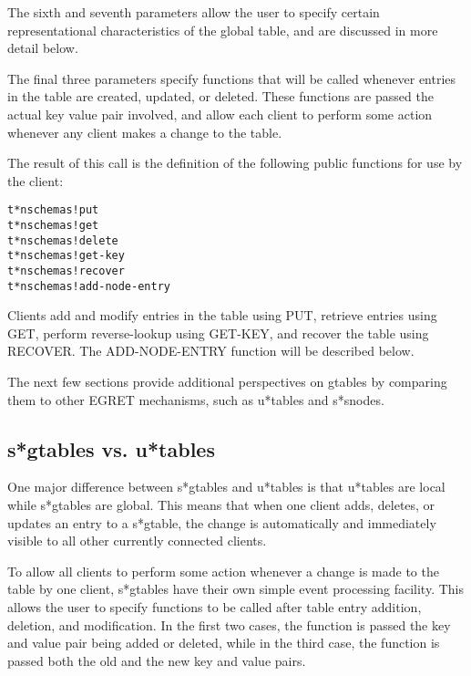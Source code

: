 The sixth and seventh parameters allow the user to specify certain
representational characteristics of the global table, and are discussed
in more detail below.

The final three parameters specify functions that will be called whenever
entries in the table are created, updated, or deleted. These functions are
passed the actual key value pair involved, and allow each client to perform
some action whenever any client makes a change to the table.

The result of this call is the definition of the following 
public functions for use by the client:
\small\begin{verbatim}
t*nschemas!put
t*nschemas!get
t*nschemas!delete
t*nschemas!get-key
t*nschemas!recover
t*nschemas!add-node-entry
\end{verbatim}\normalsize

Clients add and modify entries in the table using PUT, retrieve
entries using GET, perform reverse-lookup using GET-KEY, and recover
the table using RECOVER. The ADD-NODE-ENTRY function will be described
below.

The next few sections provide additional perspectives on gtables
by comparing them to other EGRET mechanisms, such as u*tables and
s*snodes.

\subsection{s*gtables vs. u*tables}

One major difference between s*gtables and u*tables is that u*tables
are local while s*gtables are global. This means that when one client
adds, deletes, or updates an entry to a s*gtable, the change is
automatically and immediately visible to all other currently connected
clients.  

To allow all clients to perform some action whenever a change is made
to the table by one client, s*gtables have their own simple event
processing facility.  This allows the user to specify functions to be
called after table entry addition, deletion, and modification.  In the
first two cases, the function is passed the key and value pair being
added or deleted, while in the third case, the function is passed both
the old and the new key and value pairs.

